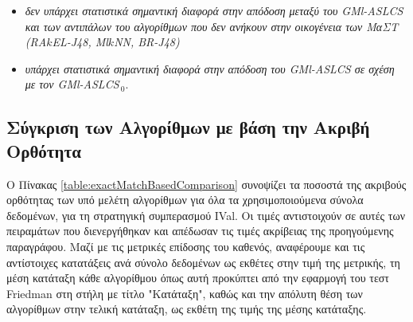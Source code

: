 \begin{itemize}
\item \emph{δεν υπάρχει στατιστικά σημαντική διαφορά στην απόδοση μεταξύ του GMl-ASLCS και των αντιπάλων του αλγορίθμων που δεν ανήκουν στην οικογένεια των ΜαΣΤ (RA$k$EL-J48, Ml$k$NN, BR-J48)}
\item \emph{υπάρχει στατιστικά σημαντική διαφορά στην απόδοση του GMl-ASLCS σε σχέση με τον GMl-ASLCS$_{\:0}$}.
\end{itemize}



\subsection{Σύγκριση των Αλγορίθμων με βάση την Ακριβή Ορθότητα}
\label{subsec:exBasedComparison}

Ο Πίνακας \ref{table:exactMatchBasedComparison} συνοψίζει τα ποσοστά της ακριβούς ορθότητας των υπό μελέτη αλγορίθμων για όλα τα χρησιμοποιούμενα σύνολα δεδομένων, για τη στρατηγική συμπερασμού IVal. Οι τιμές αντιστοιχούν σε αυτές των πειραμάτων που διενεργήθηκαν και απέδωσαν τις τιμές ακρίβειας της προηγούμενης παραγράφου. Μαζί με τις μετρικές επίδοσης του καθενός, αναφέρουμε και τις αντίστοιχες κατατάξεις ανά σύνολο δεδομένων ως εκθέτες στην τιμή της μετρικής, τη μέση κατάταξη κάθε αλγορίθμου όπως αυτή προκύπτει από την εφαρμογή του τεστ Friedman στη στήλη με τίτλο "Κατάταξη", καθώς και την απόλυτη θέση των αλγορίθμων στην τελική κατάταξη, ως εκθέτη της τιμής της μέσης κατάταξης.

